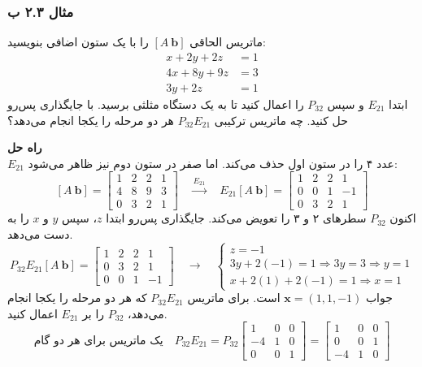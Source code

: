 \documentclass[12pt, a4paper]{book}
\begin{document}
	\subsubsection*{مثال ۲.۳ ب}
	ماتریس الحاقی $[A \ \mathbf{b}]$ را با یک ستون اضافی بنویسید:
	\begin{align*}
		x + 2y + 2z &= 1 \\
		4x + 8y + 9z &= 3 \\
		3y + 2z &= 1
	\end{align*}
	ابتدا $E_{21}$ و سپس $P_{32}$ را اعمال کنید تا به یک دستگاه مثلثی برسید. با جایگذاری پس‌رو حل کنید. چه ماتریس ترکیبی $P_{32}E_{21}$ هر دو مرحله را یکجا انجام می‌دهد؟
	
	\textbf{راه حل} \\
	$E_{21}$ عدد ۴ را در ستون اول حذف می‌کند. اما صفر در ستون دوم نیز ظاهر می‌شود:
	\[
	[A \ \mathbf{b}] = \left[ \begin{array}{ccc|c} 1 & 2 & 2 & 1 \\ 4 & 8 & 9 & 3 \\ 0 & 3 & 2 & 1 \end{array} \right]
	\quad \xrightarrow{E_{21}} \quad
	E_{21}[A \ \mathbf{b}] = \left[ \begin{array}{ccc|c} 1 & 2 & 2 & 1 \\ 0 & 0 & 1 & -1 \\ 0 & 3 & 2 & 1 \end{array} \right]
	\]
	اکنون $P_{32}$ سطرهای ۲ و ۳ را تعویض می‌کند. جایگذاری پس‌رو ابتدا $z$، سپس $y$ و $x$ را به دست می‌دهد.
	\[
	P_{32}E_{21}[A \ \mathbf{b}] = \left[ \begin{array}{ccc|c} 1 & 2 & 2 & 1 \\ 0 & 3 & 2 & 1 \\ 0 & 0 & 1 & -1 \end{array} \right]
	\quad \rightarrow \quad
	\begin{cases}
		z = -1 \\
		3y + 2(-1) = 1 \Rightarrow 3y = 3 \Rightarrow y=1 \\
		x + 2(1) + 2(-1) = 1 \Rightarrow x=1
	\end{cases}
	\]
	جواب $\mathbf{x} = (1, 1, -1)$ است.
	برای ماتریس $P_{32}E_{21}$ که هر دو مرحله را یکجا انجام می‌دهد، $P_{32}$ را بر $E_{21}$ اعمال کنید.
	\[
	\text{یک ماتریس برای هر دو گام} \quad
	P_{32}E_{21} = P_{32} \begin{bmatrix} 1 & 0 & 0 \\ -4 & 1 & 0 \\ 0 & 0 & 1 \end{bmatrix} = \begin{bmatrix} 1 & 0 & 0 \\ 0 & 0 & 1 \\ -4 & 1 & 0 \end{bmatrix}
	\]
	
\end{document}
